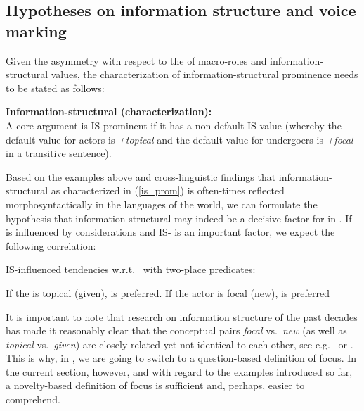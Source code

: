 \documentclass[output=paper,
,modfonts
,nonflat]{langsci/langscibook}
\begin{document}
\subsection{Hypotheses on information structure and voice marking}\label{sect:hypo}

Given the asymmetry with respect to the  of macro-roles and in\-for\-ma\-tion-struc\-tu\-ral values, the characterization of in\-for\-ma\-tion-struc\-tu\-ral pro\-mi\-nence needs to be stated as follows:

\begin{exe}
\ex\label{is_prom} \textbf{Information-structural  (characterization):}\\
A core argument is IS-prominent if it has a non-default IS value (whereby the default value for actors is \textit{+topical} and the default value for undergoers is \textit{+focal} in a transitive sentence).
\end{exe}

\noindent Based on the  examples above and cross-linguistic findings that in\-for\-ma\-tion-structural  as characterized in (\ref{is_prom}) is often-times reflected morphosyntactically in the languages of the world, we can formulate the hypothesis that in\-for\-ma\-tion-struc\-tu\-ral  may indeed be a decisive factor for  in .  If  is influenced by  considerations and IS- is an important factor, we expect the following correlation:

\begin{exe}
\ex\label{tendencies} IS-influenced tendencies w.r.t.\  with two-place predicates:
\begin{xlist}
\ex If the  is topical (given),  is preferred.
\ex If the actor is focal (new),  is preferred
\end{xlist}
\end{exe}

\noindent It is important to note that research on information structure of the past decades has made it reasonably clear that the conceptual pairs \textit{focal} vs.\ \textit{new} (as well as \textit{topical} vs.\ \textit{given}) are closely related  yet not identical to each other, see e.g.\ \cite{beada11} or \cite{riear13}. This is why, in , we are going to switch to a question-based definition of focus. In the current section, however, and with regard to the examples introduced so far, a novelty-based definition of focus is sufficient and, perhaps, easier to comprehend.
\end{document}
